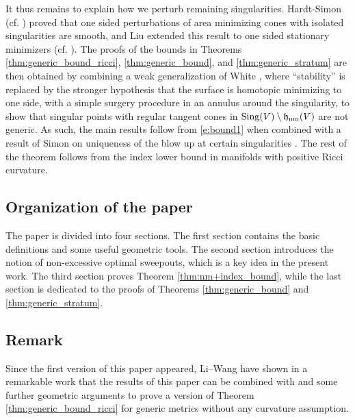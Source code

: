 \documentclass[12pt,twoside]{amsart}
\numberwithin{equation}{section}
\renewcommand{\cH}{\mathcal H}
\renewcommand{\cR}{\mathcal R}
\newcommand{\bM}{\mathbf{M}}
\DeclareMathOperator{\sing}{Sing}
\DeclareMathOperator{\hnm}{\mathfrak{h}_\textnormal{nm}}
\begin{document}

\medskip


It thus remains to explain how we perturb remaining singularities. Hardt-Simon (cf. \cite{HS}) proved that one sided perturbations of area minimizing cones with isolated singularities are smooth, and Liu extended this result to one sided stationary minimizers (cf. \cite{Liu}). The proofs of the bounds in Theorems \ref{thm:generic_bound_ricci}, \ref{thm:generic_bound}, and \ref{thm:generic_stratum} are then obtained by combining a weak generalization of White \cite{W}, where ``stability'' is replaced by the stronger hypothesis that the surface is homotopic minimizing to one side, with a simple surgery procedure in an annulus around the singularity, to show that singular points with regular tangent cones in $\sing(V) \setminus \hnm(V)$ are not generic. As such, the main results follow from \eqref{e:bound1} when combined with a result of Simon on uniqueness of the blow up at certain singularities \cite{Simon}.  The rest of the theorem follows from the index lower bound in manifolds with positive Ricci curvature.


\subsection{Organization of the paper} The paper is divided into four sections. The first section contains the basic definitions and some useful geometric tools. The second section introduces the notion of non-excessive optimal sweepouts, which is a key idea in the present work. The third section proves Theorem \ref{thm:nm+index_bound}, while the last section is dedicated to the proofs of  Theorems \ref{thm:generic_bound} and \ref{thm:generic_stratum}.

\subsection{Remark} Since the first version of this paper appeared, Li--Wang have shown in a remarkable work \cite{LiWang} that the results of this paper can be combined with \cite{Wang2020} and some further geometric arguments to prove a version of Theorem \ref{thm:generic_bound_ricci} for generic metrics without any curvature assumption.
\end{document}
